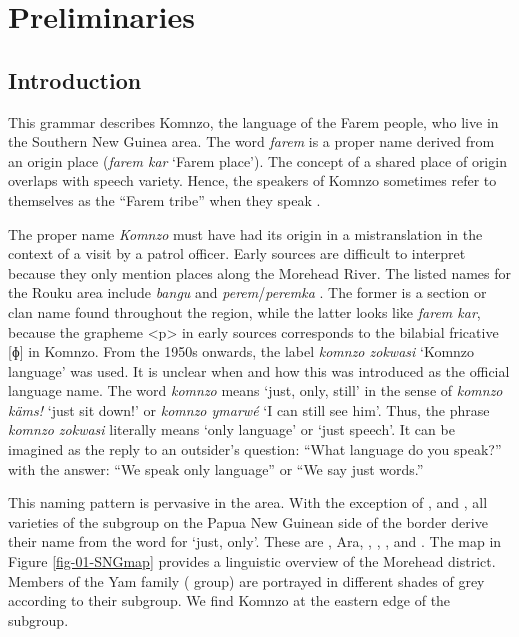 
\chapter{Preliminaries}
\label{cha:The language and its speakers}

\section{Introduction}\label{prelimintro}
This grammar describes Komnzo, the language of the Farem people, who live in the Southern New Guinea area. The word \emph{farem} is a proper name derived from an origin place (\textit{farem kar} `Farem place'). The concept of a shared place of origin overlaps with speech variety. Hence, the speakers of Komnzo sometimes refer to themselves as the ``Farem tribe'' when they speak .

The proper name \emph{Komnzo} must have had its origin in a mistranslation in the context of a visit by a patrol officer. Early sources are difficult to interpret because they only mention places along the Morehead River. The listed names for the Rouku area include \emph{bangu} \citep[292]{Ray:1907westfly} and \emph{perem}/\emph{peremka} \citep[334]{Ray:1923westerndiv}. The former is a section or clan name found throughout the region, while the latter looks like \emph{farem kar}, because the grapheme <p> in early sources corresponds to the bilabial fricative [ɸ] in Komnzo. From the 1950s onwards, the label \emph{komnzo zokwasi} `Komnzo language' was used. It is unclear when and how this was introduced as the official language name. The word \emph{komnzo} means `just, only, still' in the sense of \emph{komnzo käms!} `just sit down!' or \emph{komnzo ymarwé} `I can still see him'. Thus, the phrase \emph{komnzo zokwasi} literally means `only language' or `just speech'. It can be imagined as the reply to an outsider's question: ``What language do you speak?'' with the answer: ``We speak only language'' or ``We say just words.''

This naming pattern is pervasive in the area. With the exception of ,  and , all varieties of the  subgroup on the Papua New Guinean side of the border derive their name from the word for `just, only'. These are , Ara, , , ,  and . The map in Figure \ref{fig-01-SNGmap} provides a linguistic overview of the Morehead district. Members of the Yam family ( group) are portrayed in different shades of grey according to their subgroup. We find Komnzo at the eastern edge of the  subgroup.

